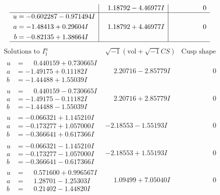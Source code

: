\documentclass[1p]{elsarticle_modified}
\theoremstyle{definition}
\newcommand{\I}{\sqrt{-1}}
\begin{document}
$$\begin{array}{c|c|c}
 & \phantom{-}1.18792 - 4.46977 I & \phantom{-0.000000 } 0 \\ \hline\begin{aligned}
u &= -0.602287 - 0.971494 I \\
a &= -1.48413 + 0.29604 I \\
b &= -0.82135 + 1.38664 I\end{aligned}
 & \phantom{-}1.18792 + 4.46977 I & \phantom{-0.000000 } 0\\
 \hline 
 \end{array}$$\newpage$$\begin{array}{c|c|c}  
\text{Solutions to }I^u_{1}& \I (\text{vol} + \sqrt{-1}CS) & \text{Cusp shape}\\
 \hline 
\begin{aligned}
u &= \phantom{-}0.440159 + 0.730665 I \\
a &= -1.49175 + 0.11182 I \\
b &= -1.44488 + 1.55039 I\end{aligned}
 & \phantom{-}2.20716 - 2.85779 I & \phantom{-0.000000 } 0 \\ \hline\begin{aligned}
u &= \phantom{-}0.440159 - 0.730665 I \\
a &= -1.49175 - 0.11182 I \\
b &= -1.44488 - 1.55039 I\end{aligned}
 & \phantom{-}2.20716 + 2.85779 I & \phantom{-0.000000 } 0 \\ \hline\begin{aligned}
u &= -0.066321 + 1.145210 I \\
a &= -0.173277 + 1.057000 I \\
b &= -0.366641 + 0.617366 I\end{aligned}
 & -2.18553 - 1.55193 I & \phantom{-0.000000 } 0 \\ \hline\begin{aligned}
u &= -0.066321 - 1.145210 I \\
a &= -0.173277 - 1.057000 I \\
b &= -0.366641 - 0.617366 I\end{aligned}
 & -2.18553 + 1.55193 I & \phantom{-0.000000 } 0 \\ \hline\begin{aligned}
u &= \phantom{-}0.571600 + 0.996567 I \\
a &= \phantom{-}1.28701 - 1.25303 I \\
b &= \phantom{-}0.21402 - 1.44820 I\end{aligned}
 & \phantom{-}1.09499 + 7.05040 I & \phantom{-0.000000 } 0 \\ \hline\begin{aligned}

\end{aligned}
\end{array}$$
\end{document}
